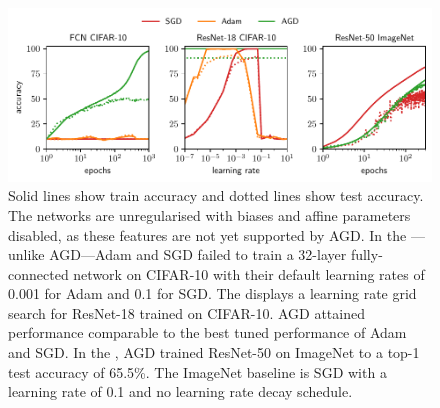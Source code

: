 \begin{figure}
    \centering
    \includegraphics[width=\textwidth]{figures/pdf/plot0}
    \caption{ Solid lines show train accuracy and dotted lines show test accuracy. The networks are unregularised with biases and affine parameters disabled, as these features are not yet supported by AGD. In the ---unlike AGD---Adam and SGD failed to train a 32-layer fully-connected network on CIFAR-10 with their default learning rates of 0.001 for Adam and 0.1 for SGD. The  displays a learning rate grid search for ResNet-18 trained on CIFAR-10. AGD attained performance comparable to the best tuned performance of Adam and SGD. In the , AGD trained ResNet-50 on ImageNet to a top-1 test accuracy of 65.5\%. The ImageNet baseline is SGD with a learning rate of 0.1 and no learning rate decay schedule.}
    \label{fig:showcase}
\end{figure}